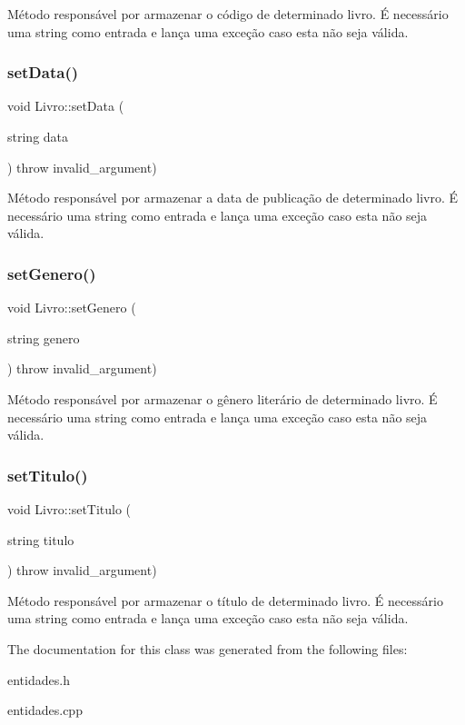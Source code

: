Método responsável por armazenar o código de determinado livro. É necessário uma string como entrada e lança uma exceção caso esta não seja válida. \mbox{\label{classLivro_a3530e8f2974791461f080563fd332fa0}} 
\subsubsection{\texorpdfstring{set\+Data()}{setData()}}
{\footnotesize\ttfamily void Livro\+::set\+Data (\begin{DoxyParamCaption}\item[{string}]{data }\end{DoxyParamCaption}) throw  invalid\+\_\+argument) }

Método responsável por armazenar a data de publicação de determinado livro. É necessário uma string como entrada e lança uma exceção caso esta não seja válida. \mbox{\label{classLivro_a780f063297948dfc6c20d564ed4a48c3}} 
\subsubsection{\texorpdfstring{set\+Genero()}{setGenero()}}
{\footnotesize\ttfamily void Livro\+::set\+Genero (\begin{DoxyParamCaption}\item[{string}]{genero }\end{DoxyParamCaption}) throw  invalid\+\_\+argument) }

Método responsável por armazenar o gênero literário de determinado livro. É necessário uma string como entrada e lança uma exceção caso esta não seja válida. \mbox{\label{classLivro_a9a33b5175b4b8666a3dc3ffbbb445b7e}} 
\subsubsection{\texorpdfstring{set\+Titulo()}{setTitulo()}}
{\footnotesize\ttfamily void Livro\+::set\+Titulo (\begin{DoxyParamCaption}\item[{string}]{titulo }\end{DoxyParamCaption}) throw  invalid\+\_\+argument) }

Método responsável por armazenar o título de determinado livro. É necessário uma string como entrada e lança uma exceção caso esta não seja válida. 

The documentation for this class was generated from the following files\+:\begin{DoxyCompactItemize}
\item 
entidades.\+h\item 
entidades.\+cpp\end{DoxyCompactItemize}
